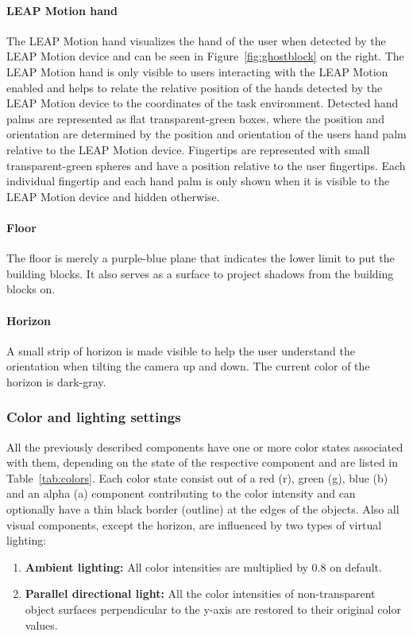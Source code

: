 \paragraph{LEAP Motion hand}
The LEAP Motion hand visualizes the hand of the user when detected by the LEAP Motion device and can be seen in Figure~\ref{fig:ghostblock} on the right. The LEAP Motion hand is only visible to users interacting with the LEAP Motion enabled and helps to relate the relative position of the hands detected by the LEAP Motion device to the coordinates of the task environment. Detected hand palms are represented as flat transparent-green boxes, where the position and orientation are determined by the position and orientation of the users hand palm relative to the LEAP Motion device. Fingertips are represented with small transparent-green spheres and have a position relative to the user fingertips. Each individual fingertip and each hand palm is only shown when it is visible to the LEAP Motion device and hidden otherwise.

\paragraph{Floor}
The floor is merely a purple-blue plane that indicates the lower limit to put the building blocks. It also serves as a surface to project shadows from the building blocks on.

\paragraph{Horizon}
A small strip of horizon is made visible to help the user understand the orientation when tilting the camera up and down. The current color of the horizon is dark-gray.


\subsubsection{Color and lighting settings}

All the previously described components have one or more color states associated with them, depending on the state of the respective component and are listed in Table~\ref{tab:colors}. Each  color state consist out of a red (r), green (g), blue (b) and an alpha (a) component contributing to the color intensity and can optionally have a thin black border (outline) at the edges of the objects. Also all visual components, except the horizon, are influenced by two types of virtual lighting: 
\begin{enumerate}
	\item{\textbf{Ambient lighting:}} All color intensities are multiplied by $0.8$ on default.
	\item{\textbf{Parallel directional light:}} All the color intensities of non-transparent object surfaces perpendicular to the y-axis are restored to their original color values.
\end{enumerate}


